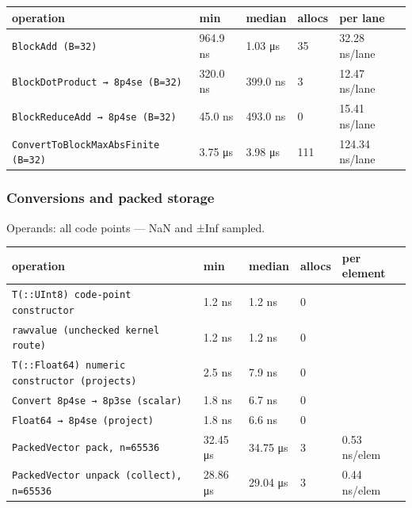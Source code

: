 \begin{table}[h]
\centering
\begin{tabulary}{\linewidth}{L L L L L}
\toprule
operation & min & median & allocs & per lane \\
\toprule
\texttt{BlockAdd (B=32)} & 964.9 ns & 1.03 μs & 35 & 32.28 ns/lane \\
\texttt{BlockDotProduct → 8p4se (\allowbreak{}B=32)} & 320.0 ns & 399.0 ns & 3 & 12.47 ns/lane \\
\texttt{BlockReduceAdd → 8p4se (\allowbreak{}B=32)} & 45.0 ns & 493.0 ns & 0 & 15.41 ns/lane \\
\texttt{ConvertToBlockMaxAbsFinite (\allowbreak{}B=32)} & 3.75 μs & 3.98 μs & 111 & 124.34 ns/lane \\
\bottomrule
\end{tabulary}

\end{table}



\subsubsection{Conversions and packed storage}



\label{4461369721169500046}{}


Operands: all code points — NaN and ±Inf sampled.




\begin{table}[h]
\centering
\begin{tabulary}{\linewidth}{L L L L L}
\toprule
operation & min & median & allocs & per element \\
\toprule
\texttt{T(\allowbreak{}::UInt8) code-point constructor} & 1.2 ns & 1.2 ns & 0 &  \\
\texttt{rawvalue (\allowbreak{}unchecked kernel route)} & 1.2 ns & 1.2 ns & 0 &  \\
\texttt{T(\allowbreak{}::Float64) numeric constructor (\allowbreak{}projects)} & 2.5 ns & 7.9 ns & 0 &  \\
\texttt{Convert 8p4se → 8p3se (\allowbreak{}scalar)} & 1.8 ns & 6.7 ns & 0 &  \\
\texttt{Float64 → 8p4se (\allowbreak{}project)} & 1.8 ns & 6.6 ns & 0 &  \\
\texttt{PackedVector pack, n=65536} & 32.45 μs & 34.75 μs & 3 & 0.53 ns/elem \\
\texttt{PackedVector unpack (\allowbreak{}collect), n=65536} & 28.86 μs & 29.04 μs & 3 & 0.44 ns/elem \\
\bottomrule
\end{tabulary}

\end{table}



